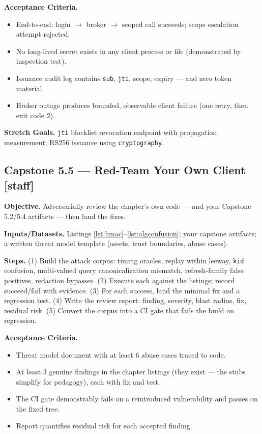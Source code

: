 \textbf{Acceptance Criteria.}
\begin{itemize}
  \item[$\square$] End-to-end: login $\rightarrow$ broker $\rightarrow$
        scoped call succeeds; scope escalation attempt rejected.
  \item[$\square$] No long-lived secret exists in any client process or
        file (demonstrated by inspection test).
  \item[$\square$] Issuance audit log contains \texttt{sub}, \texttt{jti},
        scope, expiry --- and zero token material.
  \item[$\square$] Broker outage produces bounded, observable client
        failure (one retry, then exit code 2).
\end{itemize}

\textbf{Stretch Goals.} \texttt{jti} blocklist revocation endpoint with
propagation measurement; RS256 issuance using \texttt{cryptography}.

\subsection*{Capstone 5.5 --- Red-Team Your Own Client \textbf{[staff]}}

\textbf{Objective.} Adversarially review the chapter's own code --- and your
Capstone 5.2/5.4 artifacts --- then land the fixes.

\textbf{Inputs/Datasets.} Listings \ref{lst:hmac}--\ref{lst:algconfusion};
your capstone artifacts; a written threat model template (assets, trust
boundaries, abuse cases).

\textbf{Steps.} (1) Build the attack corpus: timing oracles, replay within
leeway, \texttt{kid} confusion, multi-valued query canonicalization
mismatch, refresh-family false positives, redaction bypasses. (2) Execute
each against the listings; record succeed/fail with evidence. (3) For each
success, land the minimal fix and a regression test. (4) Write the review
report: finding, severity, blast radius, fix, residual risk. (5) Convert
the corpus into a CI gate that fails the build on regression.

\textbf{Acceptance Criteria.}
\begin{itemize}
  \item[$\square$] Threat model document with at least 6 abuse cases traced
        to code.
  \item[$\square$] At least 3 genuine findings in the chapter listings (they
        exist --- the stubs simplify for pedagogy), each with fix and test.
  \item[$\square$] The CI gate demonstrably fails on a reintroduced
        vulnerability and passes on the fixed tree.
  \item[$\square$] Report quantifies residual risk for each accepted
        finding.
\end{itemize}

